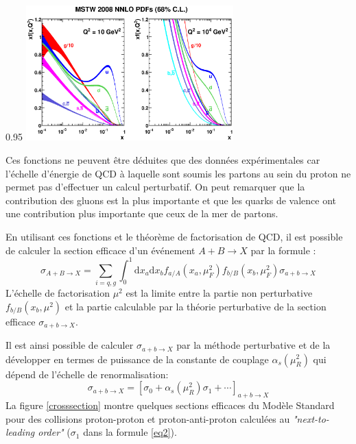 \begin{minipagewithmarginpars}[ht!]{0.95\textwidth}
	\centering
	\includegraphics[width=0.6\textwidth]{LHC/pdf.eps}
	\label{pdf}	
\end{minipagewithmarginpars}
 
Ces fonctions ne peuvent être déduites que des données expérimentales car l'échelle d'énergie de QCD à laquelle sont soumis les partons au sein du proton ne permet pas d'effectuer un calcul perturbatif. On peut remarquer que la contribution des gluons est la plus importante et que les quarks de valence ont une contribution plus importante que ceux de la mer de partons.

En utilisant ces fonctions et le théorème de factorisation de QCD, il est possible de calculer la section efficace d'un événement $A+B\rightarrow X$ par la formule :
\begin{equation}
\sigma_{A+B\rightarrow X}=\sum_{i=q,g}\int_{0}^{1} \mathrm{d}x_{a}\mathrm{d}x_{b}f_{a/A}(x_{a},\mu_{F}^{2})f_{b/B}(x_{b},\mu_{F}^{2})\sigma{_{a+b\rightarrow X}}
\end{equation}
L'échelle de factorisation $\mu^{2}$ est la limite entre la partie non perturbative $f_{b/B}(x_{b},\mu^{2})$ et la partie calculable par la théorie perturbative de la section efficace $\sigma{_{a+b\rightarrow X}}$.

Il est ainsi possible de calculer $\sigma{_{a+b\rightarrow X}}$ par la méthode perturbative et de la développer en termes de puissance de la constante de couplage $\alpha_{s}\left(\mu_{R}^{2}\right)$ qui dépend de l'échelle de renormalisation:
\begin{equation}
\sigma_{a+b\rightarrow X}=\left[\sigma_{0}+\alpha_{s}\left(\mu_{R}^{2}\right)\sigma_{1}+\cdots\right]_{a+b\rightarrow X}
\label{eq2}
\end{equation}
La figure \ref{crosssection} montre quelques sections efficaces du Modèle Standard pour des collisions proton-proton et proton-anti-proton calculées au \textit{"next-to-leading order"} ($\sigma_{1}$ dans la formule \ref{eq2}).

